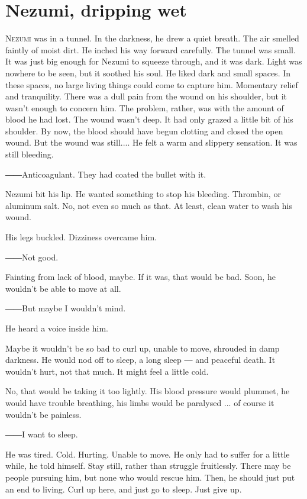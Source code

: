 
\chapter{Nezumi, dripping wet}

\lettrine{N}{ezumi} was in a tunnel. In the darkness, he drew a quiet breath. The air
smelled faintly of moist dirt. He inched his way forward carefully. The
tunnel was small. It was just big enough for Nezumi to squeeze through,
and it was dark. Light was nowhere to be seen, but it soothed his soul.
He liked dark and small spaces. In these spaces, no large living things
could come to capture him. Momentary relief and tranquility. There was a
dull pain from the wound on his shoulder, but it wasn't enough to
concern him. The problem, rather, was with the amount of blood he had
lost. The wound wasn't deep. It had only grazed a little bit of his
shoulder. By now, the blood should have begun clotting and closed the
open wound. But the wound was still.... He felt a warm and slippery
sensation. It was still bleeding.

――Anticoagulant. They had coated the bullet with it.

Nezumi bit his lip. He wanted something to stop his bleeding. Thrombin,
or aluminum salt. No, not even so much as that. At least, clean water to
wash his wound.

His legs buckled. Dizziness overcame him.

――Not good.

Fainting from lack of blood, maybe. If it was, that would be bad. Soon,
he wouldn't be able to move at all.

――But maybe I wouldn't mind.

He heard a voice inside him.

Maybe it wouldn't be so bad to curl up, unable to move, shrouded in damp
darkness. He would nod off to sleep, a long sleep ― and peaceful death.
It wouldn't hurt, not that much. It might feel a little cold.

No, that would be taking it too lightly. His blood pressure would
plummet, he would have trouble breathing, his limbs would be paralysed
... of course it wouldn't be painless.

――I want to sleep.

He was tired. Cold. Hurting. Unable to move. He only had to suffer for a
little while, he told himself. Stay still, rather than struggle
fruitlessly. There may be people pursuing him, but none who would rescue
him. Then, he should just put an end to living. Curl up here, and just
go to sleep. Just give up.

